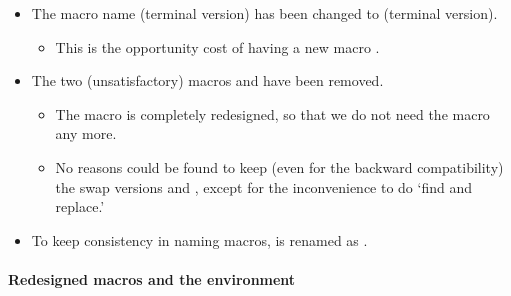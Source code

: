 \begin{itemize}\tightlist
  \item The macro name (terminal version) has been changed 
        to \cmd{\istbt} (terminal version).   
  \begin{itemize}
  \item This is the opportunity cost of having a new macro \cmd{\istB}.
  \end{itemize}
\item The two (unsatisfactory) macros  and  have been removed.
  \begin{itemize}
  \item The macro \cmd{\xtInfosetO} is completely redesigned, 
        so that we do not need the macro  any more.
  \item No reasons could be found to keep (even for the backward compatibility) 
        the swap versions  and , 
        except for the inconvenience to do `find and replace.'
  \end{itemize}
\item To keep consistency in naming macros, \cmd{\setistgrowkey} is renamed as \cmd{\setxtgrowkey}.
\end{itemize}


\paragraph{Redesigned macros and the environment}

